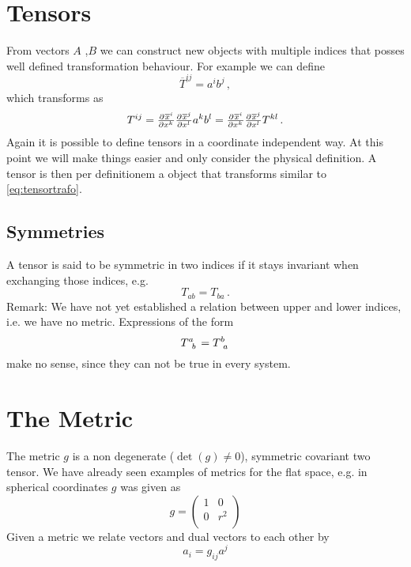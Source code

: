 \section{Tensors}
From vectors $A$ ,$B$ we can construct new objects with multiple indices that posses well defined transformation behaviour. 
For example we can define
\begin{equation}
    \overline{T}^{ij}=a^ib^j\, ,
\end{equation}
which transforms as
\begin{equation}
    T^{ij}=\pd{\overline{x}^i}{{x^k}}\pd{\overline{x}^j}{{x^l}}a^kb^l=\pd{\overline{x}^i}{{x^k}}\pd{\overline{x}^j}{{x^l}}T^{kl}\,
   .\label{eq:tensortrafo}
\end{equation}
Again it is possible to define tensors in a coordinate independent way. 
At this point we will make things easier and only consider the physical definition. 
A tensor is then per definitionem a object that transforms similar to
\eqref{eq:tensortrafo}.
\subsection{Symmetries}
A tensor is said to be symmetric in two indices if it stays invariant when exchanging those indices, e.g.
\begin{equation}
    T_{ab}=T_{ba}\, .
\end{equation}
Remark: We have not yet established a relation between upper and lower indices, i.e. we have no metric. Expressions of the form
\begin{equation}
    \tensor{T}{^a_b}=\tensor{T}{^b_a}
\end{equation}
make no sense, since they can not be true in every system.
\section{The Metric}
The metric $g$ is a non degenerate ($\det(g)\neq 0$), symmetric covariant two tensor. 
We have already seen examples of metrics for the flat space, e.g. in spherical coordinates $g$ was given as
\begin{equation}
    g=
    \begin{pmatrix}
        1 & 0\\
        0 & r^2\\
    \end{pmatrix}
\end{equation}
Given a metric we relate vectors and dual vectors to each other by
\begin{equation}
    a_i=g_{ij}a^j
\end{equation}
